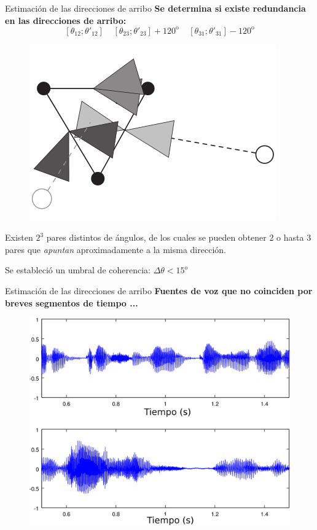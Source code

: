\documentclass[12pt,aspectratio=169]{beamer}
\begin{document}
	\begin{frame}{Estimación de las direcciones de arribo}
		\textbf{Se determina si existe redundancia en las direcciones de arribo:}
		\begin{equation}
		\left[\theta_{12}; \theta'_{12}\right]~~~~~\left[\theta_{23}; \theta'_{23}\right]+120^{\mathrm{o}}~~~~~\left[\theta_{31}; \theta'_{31}\right]-120^{\mathrm{o}}
		\end{equation}		
		\hspace{5mm}
		\begin{minipage}{70mm}
			\begin{figure}[h]
				\centering
				\includegraphics[width=\linewidth]{figures/redundancia}
			\end{figure}
		\end{minipage}
	\hspace{5mm}
		\begin{minipage}{60mm}
			Existen $2^3$ pares distintos de ángulos, de los cuales se pueden obtener 2 o hasta 3 pares que \textit{apuntan} aproximadamente a la misma dirección.
			\vspace{5mm}	
		
			\pause
			
			Se estableció un umbral de coherencia: $\Delta \theta < 15^{\mathrm{o}}$
		\end{minipage}
	\end{frame}

	\begin{frame}{Estimación de las direcciones de arribo}
	\textbf{Fuentes de voz que no coinciden por breves segmentos de tiempo ...}
	\begin{figure}[h]
		\centering
		\includegraphics[width=0.5\linewidth]{figures/nonoverlap}
	\end{figure}
	\end{frame}
	
\end{document}
